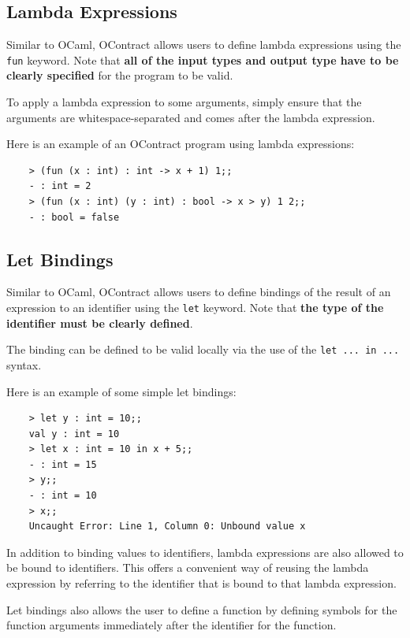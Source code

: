 \documentclass[a4paper]{article}
\begin{document}
\subsection{Lambda Expressions}

Similar to OCaml, OContract allows users to define lambda expressions using the \texttt{fun} keyword.
Note that \textbf{all of the input types and output type have to be clearly specified} for the program to be valid.

To apply a lambda expression to some arguments, simply ensure that the arguments are whitespace-separated and comes after the lambda expression.

Here is an example of an OContract program using lambda expressions:

\begin{verbatim}
    > (fun (x : int) : int -> x + 1) 1;;
    - : int = 2
    > (fun (x : int) (y : int) : bool -> x > y) 1 2;;
    - : bool = false
\end{verbatim}

\subsection{Let Bindings}

Similar to OCaml, OContract allows users to define bindings of the result of an expression to an identifier using the \texttt{let} keyword.
Note that \textbf{the type of the identifier must be clearly defined}.

The binding can be defined to be valid locally via the use of the \texttt{let ... in ...} syntax.

Here is an example of some simple let bindings:

\begin{verbatim}
    > let y : int = 10;;
    val y : int = 10
    > let x : int = 10 in x + 5;;
    - : int = 15
    > y;;
    - : int = 10
    > x;;
    Uncaught Error: Line 1, Column 0: Unbound value x
\end{verbatim}

In addition to binding values to identifiers, lambda expressions are also allowed to be bound to identifiers.
This offers a convenient way of reusing the lambda expression by referring to the identifier that is bound to that lambda expression.

Let bindings also allows the user to define a function by defining symbols for the function arguments immediately after the identifier for the function.
\end{document}
